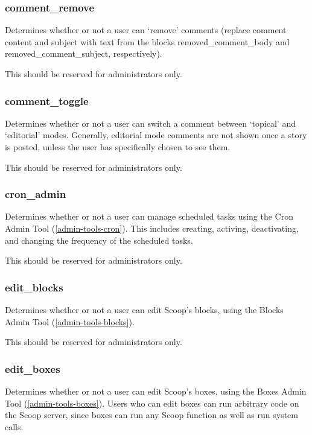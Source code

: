 \subsubsection{comment\_remove}
\label{perm-comment-remove}

Determines whether or not a user can `remove' comments (replace comment content and subject with text from the blocks removed\_comment\_body and removed\_comment\_subject, respectively).

This should be reserved for administrators only.

\subsubsection{comment\_toggle}
\label{perm-comment-toggle}

Determines whether or not a user can switch a comment between `topical' and `editorial' modes. Generally, editorial mode comments are not shown once a story is posted, unless the user has specifically chosen to see them.

This should be reserved for administrators only.

\subsubsection{cron\_admin}
\label{perm-cron-admin}

Determines whether or not a user can manage scheduled tasks using the Cron Admin Tool (\ref{admin-tools-cron}).  This includes creating, activing, deactivating, and changing the frequency of the scheduled tasks.

This should be reserved for administrators only.

\subsubsection{edit\_blocks}
\label{perm-edit-blocks}

Determines whether or not a user can edit Scoop's blocks, using the Blocks Admin Tool (\ref{admin-tools-blocks}).

This should be reserved for administrators only.

\subsubsection{edit\_boxes}
\label{perm-edit-boxes}

Determines whether or not a user can edit Scoop's boxes, using the Boxes Admin Tool (\ref{admin-tools-boxes}).  Users who can edit boxes can run arbitrary code on the Scoop server, since boxes can run any Scoop function as well as run system calls.

